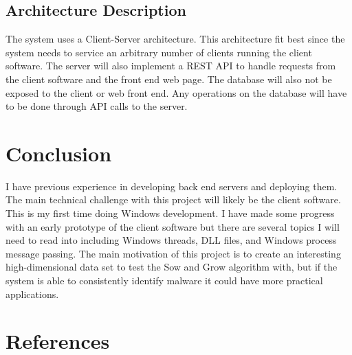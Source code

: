 \documentclass[titlepage]{article}
\begin{document}
\subsection{Architecture Description}
\begin{flushleft}
The system uses a Client-Server architecture. This architecture fit best since the system needs to service an arbitrary number of clients running the client software. The server will also implement a REST API to handle requests from the client software and the front end web page. The database will also not be exposed to the client or web front end. Any operations on the database will have to be done through API calls to the server.
\end{flushleft}

\section{Conclusion}
\begin{flushleft}
    I have previous experience in developing back end servers and deploying them. The main technical challenge with this project will likely be the client software. This is my first time doing Windows development. I have made some progress with an early prototype of the client software but there are several topics I will need to read into including Windows threads, DLL files, and Windows process message passing. The main motivation of this project is to create an interesting high-dimensional data set to test the Sow and Grow algorithm with, but if the system is able to consistently identify malware it could have more practical applications.
\end{flushleft}


\section{References}
\printbibliography[heading=none]
\end{document}
